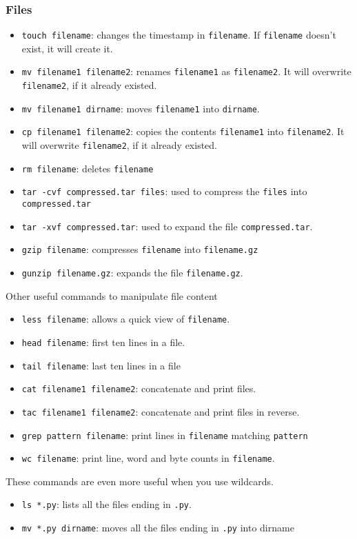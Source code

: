 \documentclass{article}
\begin{document}
\subsubsection*{Files}
\begin{itemize}
\item  \verb"touch filename": changes the timestamp in \verb"filename". If \verb"filename" doesn't exist, it will create it.
\item\verb"mv filename1 filename2": renames \verb"filename1" as \verb"filename2". It will overwrite \verb"filename2", if it already existed.
\item\verb"mv filename1 dirname": moves \verb"filename1" into \verb"dirname".
\item\verb"cp filename1 filename2": copies the contents \verb"filename1" into \verb"filename2". It will overwrite \verb"filename2", if it already existed.
\item\verb"rm filename": deletes \verb"filename"
\item\verb"tar -cvf compressed.tar files": used to compress the \verb"files" into \verb"compressed.tar"
\item\verb"tar -xvf compressed.tar": used to expand the file \verb"compressed.tar".
\item \verb"gzip filename": compresses \verb"filename" into \verb"filename.gz"
\item \verb"gunzip filename.gz": expands the file \verb"filename.gz".
\end{itemize}



Other useful commands to manipulate file content
\begin{itemize}
\item\verb"less filename": allows a quick view of \verb"filename".
\item\verb"head filename": first ten lines in a file.
\item\verb"tail filename": last ten lines in a file
\item\verb"cat filename1 filename2": concatenate and print files.
\item\verb"tac filename1 filename2": concatenate and print files in reverse.
\item\verb"grep pattern filename": print lines in \verb"filename" matching \verb"pattern"
\item\verb"wc filename": print line, word and byte counts in \verb"filename". 
\end{itemize}

These commands are even more useful when you use wildcards.
\begin{itemize}
\item\verb"ls *.py": lists all the files ending in \verb".py".
\item\verb"mv *.py dirname": moves all the files ending in \verb".py" into dirname
\end{itemize}
\end{document}
